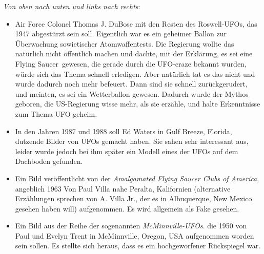 \documentclass{scrartcl}
\begin{document}
\textit{Von oben nach unten und links nach rechts}:

\begin{itemize}
	\item Air Force Colonel Thomas J. DuBose mit den Resten des Roswell-\frq UFOs\flq, das 1947 abgestürzt sein soll. Eigentlich war es ein geheimer Ballon zur Überwachung sowietischer Atomwaffentests. Die Regierung wollte das natürlich nicht öffentlich machen und dachte, mit der Erklärung, es sei eine \frq Flying Saucer\flq\ gewesen, die gerade durch die UFO-craze bekannt wurden, würde sich das Thema schnell erledigen. Aber natürlich tat es das nicht und wurde dadurch noch mehr befeuert. Dann sind sie schnell zurückgerudert, und meinten, es sei ein Wetterballon gewesen. Dadurch wurde der Mythos geboren, die US-Regierung wisse mehr, als sie erzähle, und halte Erkenntnisse zum Thema UFO geheim.



	\item In den Jahren 1987 und 1988 soll Ed Waters in Gulf Breeze, Florida, dutzende Bilder von UFOs gemacht haben. Sie sahen sehr interessant aus, leider wurde jedoch bei ihm später ein Modell eines der UFOs auf dem Dachboden gefunden.
	\item Ein Bild veröffentlicht von der \frq\textit{Amalgamated Flying Saucer Clubs of America}\flq, angeblich 1963 Von Paul Villa nahe Peralta, Kalifornien (alternative Erzählungen sprechen von A. Villa Jr., der es in Albuquerque, New Mexico gesehen haben will) aufgenommen. Es wird allgemein als Fake gesehen.
	\item Ein Bild aus der Reihe der sogenannten \textit{McMinnville-UFOs}. die 1950 von Paul und Evelyn Trent in McMinnville, Oregon, USA aufgenommen worden sein sollen. Es stellte sich heraus, dass es ein hochgeworfener Rückspiegel war.


\end{itemize}
\end{document}
